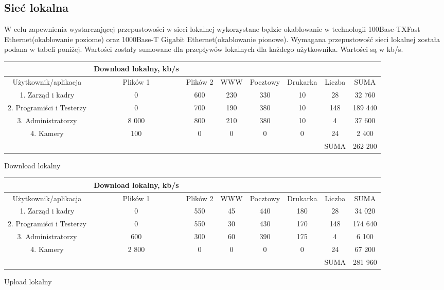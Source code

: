 \documentclass{article}
\begin{document}
\subsection{Sieć lokalna}
W celu zapewnienia wystarczającej przepustowości w sieci lokalnej wykorzystane będzie okablowanie w technologii 100Base-TXFast Ethernet(okablowanie poziome) oraz 1000Base-T Gigabit Ethernet(okablowanie pionowe).  Wymagana przepustowość sieci lokalnej została podana w tabeli poniżej. Wartości zostały sumowane dla przepływów lokalnych dla każdego użytkownika. Wartości są w kb/s.

\begin{Tabela}[!ht]
	\centering
\begin{tabular}{|c|c|c|c|c|c|c|c} \hline
	& Download lokalny, kb/s \\
	\hline
	Użytkownik/aplikacja & Plików 1 & Plików 2&WWW&Pocztowy&Drukarka&Liczba&SUMA\\
	\hline
	1. Zarząd i kadry  & 0 & 600&230&330&10&28&32 760\\
	2. Programiści i Testerzy & 0 & 700&190&380&10&148&189 440\\
	3. Administratorzy & 8 000 & 800&210&380&10&4&37 600\\
	4. Kamery & 100 & 0&0&0&0&24&2 400\\
	\hline
	\hline
	&&&&&&SUMA &262 200 \\
	\hline
\end{tabular}
\caption{Download lokalny}
\end{Tabela}
\begin{Tabela}[!ht]
	\centering
	\begin{tabular}{|c|c|c|c|c|c|c|c} \hline
		& Download lokalny, kb/s \\
		\hline
		Użytkownik/aplikacja & Plików 1 & Plików 2&WWW&Pocztowy&Drukarka&Liczba&SUMA\\
		\hline
		1. Zarząd i kadry  & 0 & 550 & 45 & 440 & 180 & 28 & 34 020\\
		2. Programiści i Testerzy & 0 & 550 & 30 & 430 & 170 & 148 & 174 640\\
		3. Administratorzy & 600 & 300 & 60 & 390 & 175 & 4 &6 100\\
		4. Kamery & 2 800 & 0 & 0 & 0 & 0 & 24 & 67 200\\
		\hline
		\hline
		&&&&&&SUMA &281 960 \\
		\hline
	\end{tabular}
	\caption{Upload lokalny}
\end{Tabela}
\end{document}
